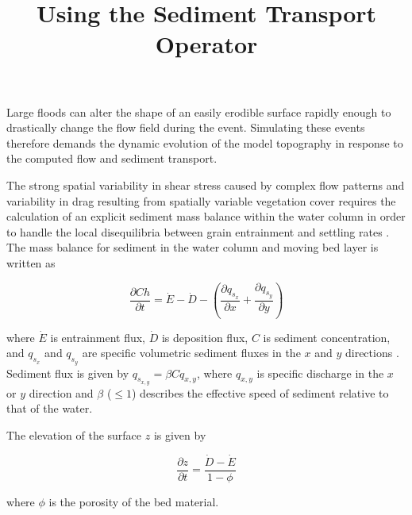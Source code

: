 \documentclass[11pt]{article}
\begin{document}
\title{Using the Sediment Transport Operator}
\maketitle

Large floods can alter the shape of an easily erodible surface rapidly enough to drastically change the flow field during the event. Simulating these events therefore demands the dynamic evolution of the model topography in response to the computed flow and sediment transport.

The strong spatial variability in shear stress caused by complex flow patterns and variability in drag resulting from spatially variable vegetation cover requires the calculation of an explicit sediment mass balance within the water column in order to handle the local disequilibria between grain entrainment and settling rates \citep{davy2009fluvial}. The mass balance for sediment in the water column and moving bed layer is written as

\begin{equation}
\frac{\partial C h}{\partial t} = \dot{E} - \dot{D} - \left(\frac{\partial q_{s_x}}{\partial x} + \frac{\partial q_{s_y}}{\partial y} \right)
\end{equation}

\noindent where $\dot{E}$ is entrainment flux, $\dot{D}$ is deposition flux, $C$ is sediment concentration, and $q_{s_x}$ and $q_{s_y}$ are specific volumetric sediment fluxes in the $x$ and $y$ directions \citep[e.g.,][]{davy2009fluvial}. Sediment flux is given by $q_{s_{x,y}} = \beta C q_{x,y}$, where $q_{x,y}$ is specific discharge in the $x$ or $y$ direction and $\beta$ ($\le 1$) describes the effective speed of sediment relative to that of the water.

The elevation of the surface $z$ is given by

\begin{equation}
\frac{\partial z}{\partial t} = \frac{\dot{D} - \dot{E}}{1 - \phi}
\end{equation}

\noindent where $\phi$ is the porosity of the bed material.
\end{document}
